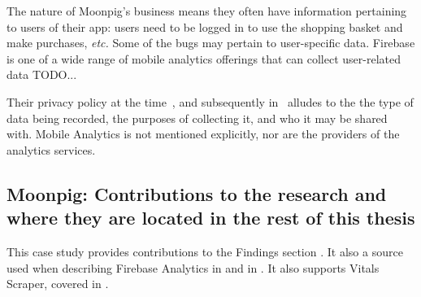 The nature of Moonpig's business means they often have information pertaining to users of their app: users need to be logged in to use the shopping basket and make purchases, \emph{etc.} 
Some of the bugs may pertain to user-specific data. Firebase is one of a wide range of mobile analytics offerings that can collect user-related data TODO...


Their privacy policy at the time~\citep{moonpig_privacy_policy_2019_feb_21}, and subsequently in~\citep{moonpig_privacy_policy_2021_aug_12} alludes to the the type of data being recorded, the purposes of collecting it, and who it may be shared with. Mobile Analytics is not mentioned explicitly, nor are the providers of the analytics services.



\subsection{Moonpig: Contributions to the research and where they are located in the rest of this thesis}
This case study provides contributions to the Findings section . It also a source used when describing Firebase Analytics in  and in . It also supports Vitals Scraper, covered in . 


